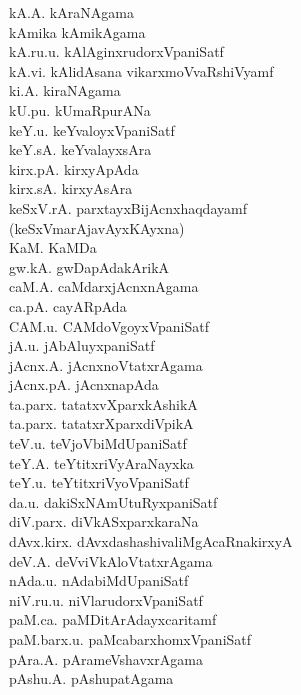 {\begin{multicols}{2}
\begin{tabbing}
kA.A. \> kAraNAgama\\[2pt]
kAmika \> kAmikAgama\\[2pt]
kA.ru.u. \> kAlAginxrudorxVpaniSatf\\[2pt]
kA.vi. \> kAlidAsana vikarxmoVvaRshiVyamf\\[2pt]
ki.A. \> kiraNAgama\\[2pt]
kU.pu. \> kUmaRpurANa\\[2pt]
keY.u. \> keYvaloyxVpaniSatf\\[2pt]
keY.sA. \> keYvalayxsAra\\[2pt]
kirx.pA. \> kirxyApAda\\[2pt]
kirx.sA. \> kirxyAsAra\\[2pt]
keSxV.rA. \> parxtayxBijAcnxhaqdayamf\\[2pt]
(keSxVmarAjavAyxKAyxna) \> \\[2pt]
KaM. \> KaMDa\\[2pt]
gw.kA. \> gwDapAdakArikA\\[2pt]
caM.A. \> caMdarxjAcnxnAgama\\[2pt]
ca.pA. \> cayARpAda\\[2pt]
CAM.u. \> CAMdoVgoyxVpaniSatf\\[2pt]
jA.u. \> jAbAluyxpaniSatf\\[2pt]
jAcnx.A. \> jAcnxnoVtatxrAgama\\[2pt]
jAcnx.pA. \> jAcnxnapAda\\[2pt]
ta.parx. \> tatatxvXparxkAshikA\\[2pt]
ta.parx. \> tatatxrXparxdiVpikA\\[2pt]
teV.u. \> teVjoVbiMdUpaniSatf\\[2pt]
teY.A. \> teYtitxriVyAraNayxka\\[2pt]
teY.u. \> teYtitxriVyoVpaniSatf\\[2pt]
da.u. \> dakiSxNAmUtuRyxpaniSatf\\[2pt]
diV.parx. \> diVkASxparxkaraNa\\[2pt]
dAvx.kirx. \> dAvxdashashivaliMgAcaRnakirxyA\\[2pt]
deV.A. \> deVviVkAloVtatxrAgama\\[2pt]
nAda.u. \> nAdabiMdUpaniSatf\\[2pt]
niV.ru.u. \> niVlarudorxVpaniSatf\\[2pt]
paM.ca. \> paMDitArAdayxcaritamf\\[2pt]
paM.barx.u. \> paMcabarxhomxVpaniSatf\\[2pt]
pAra.A. \> pArameVshavxrAgama\\[2pt]
pAshu.A. \> pAshupatAgama\\[2pt]

\end{tabbing}
\end{multicols}}
